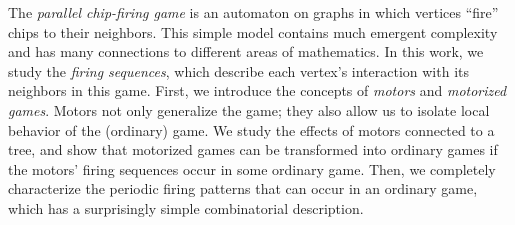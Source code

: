The \emph{parallel chip-firing game} is an automaton on graphs in which
vertices ``fire'' chips to their neighbors. This simple model contains much emergent complexity and has many connections to different areas of mathematics. In this work, we study the \emph {firing sequences}, which describe each vertex's interaction with its neighbors in this game. First, we introduce the concepts of \emph{motors} and \emph{motorized games}. Motors not only generalize the game; they also allow us to isolate local behavior of the (ordinary) game. We study the effects of motors connected to a tree, and show that motorized games can be transformed into ordinary games if the motors' firing sequences occur in some ordinary game. Then, we completely characterize the periodic firing patterns that can occur in an ordinary game, which has a surprisingly simple combinatorial description.